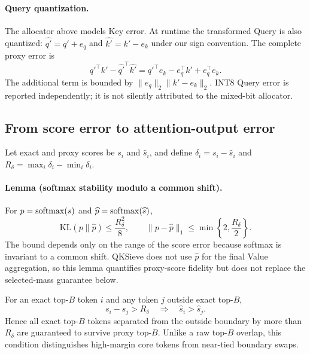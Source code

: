 \paragraph{Query quantization.}
The allocator above models Key error.
At runtime the transformed Query is also quantized:
$\widehat{q'}=q'+e_q$ and $\widehat{k'}=k'-e_k$ under our sign convention.
The complete proxy error is
\begin{equation}
 {q'}^\top k'-{\widehat{q'}}^\top\widehat{k'}
 ={q'}^\top e_k-e_q^\top k'+e_q^\top e_k.
 \label{eq:query-key-quant-error}
\end{equation}
The additional term is bounded by
$\|e_q\|_2\|k'-e_k\|_2$.
INT8 Query error is reported independently; it is not silently attributed to
the mixed-bit allocator.

\subsection{From score error to attention-output error}

Let exact and proxy scores be $s_i$ and $\widehat s_i$, and define
$\delta_i=s_i-\widehat s_i$ and
$R_\delta=\max_i\delta_i-\min_i\delta_i$.
\paragraph{Lemma (softmax stability modulo a common shift).}
For $p=\operatorname{softmax}(s)$ and $\widehat p=\operatorname{softmax}(\widehat s)$,
\begin{equation}
 \mathrm{KL}(p\|\widehat p)\le\frac{R_\delta^2}{8},
 \qquad
 \|p-\widehat p\|_1\le
 \min\!\left\{2,\frac{R_\delta}{2}\right\}.
 \label{eq:softmax-range-bound}
\end{equation}
The bound depends only on the range of the score error because softmax is
invariant to a common shift.  QKSieve does not use $\widehat p$ for the final
Value aggregation, so this lemma quantifies proxy-score fidelity but does
not replace the selected-mass guarantee below.

For an exact top-$B$ token $i$ and any token $j$ outside exact top-$B$,
\begin{equation}
 s_i-s_j>R_\delta\quad\Longrightarrow\quad
 \widehat s_i>\widehat s_j.
 \label{eq:ranking-margin}
\end{equation}
Hence all exact top-$B$ tokens separated from the outside boundary by more
than $R_\delta$ are guaranteed to survive proxy top-$B$.
Unlike a raw top-$B$ overlap, this condition distinguishes high-margin core
tokens from near-tied boundary swaps.

